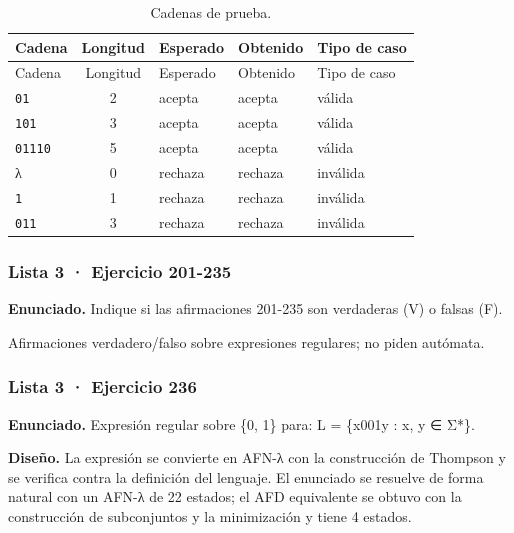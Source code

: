 \begin{longtable}[]{@{}lclll@{}}
\caption{Cadenas de prueba.}\tabularnewline
\toprule\noalign{}
Cadena & Longitud & Esperado & Obtenido & Tipo de caso \\
\midrule\noalign{}
\endfirsthead
\toprule\noalign{}
Cadena & Longitud & Esperado & Obtenido & Tipo de caso \\
\midrule\noalign{}
\endhead
\bottomrule\noalign{}
\endlastfoot
\texttt{01} & 2 & acepta & acepta & válida \\
\texttt{101} & 3 & acepta & acepta & válida \\
\texttt{01110} & 5 & acepta & acepta & válida \\
λ & 0 & rechaza & rechaza & inválida \\
\texttt{1} & 1 & rechaza & rechaza & inválida \\
\texttt{011} & 3 & rechaza & rechaza & inválida \\
\end{longtable}


\hypertarget{lista-3-ejercicio-201-235}{%
\subsubsection{Lista 3 · Ejercicio 201-235}\label{lista-3-ejercicio-201-235}}

\textbf{Enunciado.} Indique si las afirmaciones 201-235 son verdaderas (V) o falsas (F).

Afirmaciones verdadero/falso sobre expresiones regulares; no piden autómata.

\hypertarget{lista-3-ejercicio-236}{%
\subsubsection{Lista 3 · Ejercicio 236}\label{lista-3-ejercicio-236}}

\textbf{Enunciado.} Expresión regular sobre \{0, 1\} para: L = \{x001y : x, y ∈ Σ*\}.

\textbf{Diseño.} La expresión se convierte en AFN-λ con la construcción de Thompson y se verifica contra la definición del lenguaje. El enunciado se resuelve de forma natural con un AFN-λ de 22 estados; el AFD equivalente se obtuvo con la construcción de subconjuntos y la minimización y tiene 4 estados.

